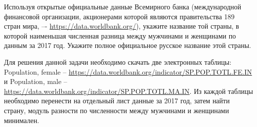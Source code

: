 
Используя открытые официальные данные Всемирного банка (международной финансовой организации, акционерами которой являются правительства 189 стран мира, –- \url{https://data.worldbank.org/}), укажите название той страны, в которой наименьшая численная разница между мужчинами и женщинами по данным за 2017 год. Укажите полное официальное русское название этой страны.

\solutionSection

Для решения данной задачи необходимо скачать две электронных таблицы: Population, female -- \url{https://data.worldbank.org/indicator/SP.POP.TOTL.FE.IN} и Population, male  -- \url{https://data.worldbank.org/indicator/SP.POP.TOTL.MA.IN}.
Из каждой таблицы необходимо перенести на отдельный лист данные за 2017 год, затем найти страну, модуль разности по численности между мужчинами и женщинами минимален.

